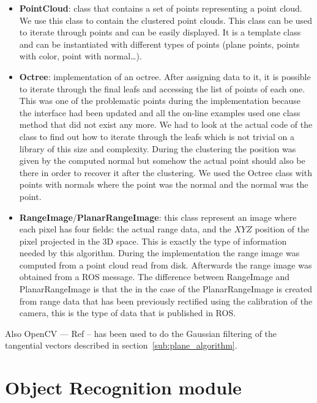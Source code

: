 \documentclass[fontsize=12pt]{article}
\begin{document}
\begin{itemize}
    \item \textbf{PointCloud}: class that contains a set of points representing a point cloud. We use this class to contain the clustered point clouds. This class can be used to iterate through points and can be easily displayed. It is a template class and can be instantiated with different types of points (plane points, points with color, point with normal\ldots).
    \item \textbf{Octree}: implementation of an octree. After assigning data to it, it is possible to iterate through the final leafs and accessing the list of points of each  one. This was one of the problematic points during the implementation because the interface had been updated and all the on-line examples used one class method that did not exist any more. We had to look at the actual code of the class to find out how to iterate through the leafs which is not trivial on a library of this size and complexity. During the clustering the position was given by the computed normal but somehow the actual point should also be there in order to recover it after the clustering. We used the Octree class with points with normals where the point was the normal and the normal was the point.
    \item \textbf{RangeImage}/\textbf{PlanarRangeImage}: this class represent an image where each pixel has four fields: the actual range data, and the $XYZ$ position of the pixel projected in the 3D space. This is exactly  the type of information needed by this algorithm. During the implementation the range image was computed from a point cloud read from disk. Afterwards the range image was obtained from a ROS message. The difference between RangeImage and PlanarRangeImage is that the in the case of the PlanarRangeImage is created from range data that has been previously rectified using the calibration of the camera, this is the type of data that is published in ROS.
\end{itemize}

Also OpenCV --- Ref -- has been used to do the Gaussian filtering of the tangential vectors described in section~\ref{sub:plane_algorithm}.




\section{Object Recognition module}
\label{sec:recognition}
\end{document}
